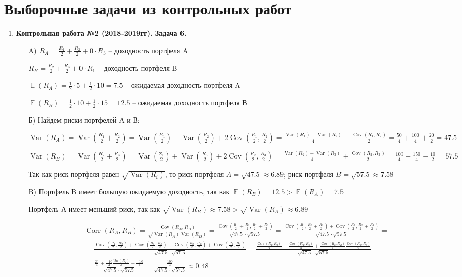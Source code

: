 \documentclass[112pt, cmcyralt]{article}
\DeclareMathOperator{\Var}{Var}
\DeclareMathOperator{\Cov}{Cov}
\DeclareMathOperator{\Corr}{Corr}
\DeclareMathOperator{\E}{\mathbb{E}}
\begin{document}
\section{Выборочные задачи из контрольных работ}
\begin{enumerate}


\item
\textbf{Контрольная работа №2 (2018-2019гг). Задача 6.}
\begin{enumerate}

\item[A)] 
$R_A = \frac{R_1}{2} + \frac{R_2}{2} + 0\cdot R_3$ -- доходность портфеля A

$R_B = \frac{R_2}{2} + \frac{R_3}{2} + 0\cdot R_1$  -- доходность портфеля B

$\E(R_A) = \frac{1}{2}\cdot5 + \frac{1}{2}\cdot10 = 7.5$  -- ожидаемая доходность портфеля A

$\E(R_B) = \frac{1}{2}\cdot10 + \frac{1}{2}\cdot15 = 12.5$ -- ожидаемая доходность портфеля В\\


\item[Б)] 
Найдем риски портфелей A и В:

$\Var(R_A) = \Var(\frac{R_1}{2} + \frac{R_2}{2}) = \Var(\frac{R_1}{2}) + \Var(\frac{R_2}{2}) + 2\Cov(\frac{R_1}{2}, \frac{R_2}{2}) = \frac{\Var(R_1)+\Var(R_2)}{4} + \frac{\Cov(R_1,R_2)}{2} = \frac{50}{4} + \frac{100}{4}+ \frac{20}{2} = 47.5$

$\Var(R_B) = \Var(\frac{R_2}{2} + \frac{R_3}{2}) = \Var(\frac{2_1}{2}) + \Var(\frac{R_3}{2}) + 2\Cov(\frac{R_2}{2}, \frac{R_3}{2}) = \frac{\Var(R_2)+\Var(R_3)}{4} + \frac{\Cov(R_2,R_3)}{2} = \frac{100}{4} + \frac{150}{4}- \frac{10}{2} = 57.5$

Так как риск портфеля равен $\sqrt{\Var(R_i)}$, то риск портфеля $A = \sqrt{47.5} \approx 6.89$; риск портфеля $B = \sqrt{57.5} \approx 7.58$\\


\item[B)] 
Портфель B имеет большую ожидаемую доходность, так как $\E(R_B) = 12.5 > \E(R_A) = 7.5$

Портфель А имеет меньший риск, так как $\sqrt{\Var(R_B)} \approx 7.58 > \sqrt{\Var(R_A)} \approx 6.89$

\begin{align*}
\Corr(R_A,R_B)=\frac{\Cov(R_A,R_B)}{\sqrt{\Var(R_A)\Var(R_B)}}=
\frac{\Cov(\frac{R_1}{2}+\frac{R_2}{2},\frac{R_2}{2}+\frac{R_3}{2})}{\sqrt{47.5}\cdot\sqrt{57.5}}=
\frac{\Cov(\frac{R_1}{2},\frac{R_2}{2}+\frac{R_3}{2})+\Cov(\frac{R_2}{2},\frac{R_2}{2}+\frac{R_3}{2})}{\sqrt{47.5}\cdot\sqrt{57.5}}=\\
=
\frac{\Cov(\frac{R_1}{2},\frac{R_2}{2})+\Cov(\frac{R_1}{2},\frac{R_3}{2})+\Cov(\frac{R_2}{2},\frac{R_2}{2})+\Cov(\frac{R_2}{2},\frac{R_3}{2})}{\sqrt{47.5}\cdot\sqrt{57.5}}=
\frac{\frac{\Cov(R_1,R_2)}{4}+\frac{\Cov(R_1,R_3)}{4}+\frac{\Cov(R_2,R_2)}{4}\frac{\Cov(R_2,R_3)}{4}}{\sqrt{47.5}\cdot\sqrt{57.5}}=\\
=\frac{\frac{20}{4}+\frac{-10}{4}\frac{Var(R_2)}{4}+\frac{-10}{4}}{\sqrt{47.5}\cdot\sqrt{57.5}}=
\frac{\frac{100}{4}}{\sqrt{47.5}\cdot\sqrt{57.5}} \approx 0.48
\end{align*}


\end{enumerate}
\end{enumerate}
\end{document}
